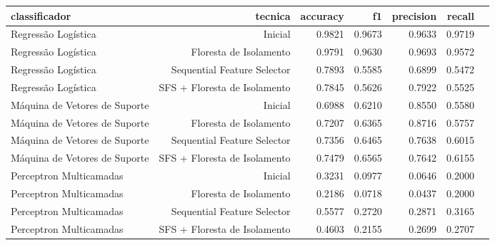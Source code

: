 \begin{tabular}{|l|r|r|r|r|r|r|}
\hline
                 classificador &                       tecnica &  accuracy &      f1 &  precision &  recall \\
\hline
           Regressão Logística &                       Inicial &    0.9821 &  0.9673 &     0.9633 &  0.9719 \\
           Regressão Logística &        Floresta de Isolamento &    0.9791 &  0.9630 &     0.9693 &  0.9572 \\
           Regressão Logística &   Sequential Feature Selector &    0.7893 &  0.5585 &     0.6899 &  0.5472 \\
           Regressão Logística &  SFS + Floresta de Isolamento &    0.7845 &  0.5626 &     0.7922 &  0.5525 \\
 Máquina de Vetores de Suporte &                       Inicial &    0.6988 &  0.6210 &     0.8550 &  0.5580 \\
 Máquina de Vetores de Suporte &        Floresta de Isolamento &    0.7207 &  0.6365 &     0.8716 &  0.5757 \\
 Máquina de Vetores de Suporte &   Sequential Feature Selector &    0.7356 &  0.6465 &     0.7638 &  0.6015 \\
 Máquina de Vetores de Suporte &  SFS + Floresta de Isolamento &    0.7479 &  0.6565 &     0.7642 &  0.6155 \\
       Perceptron Multicamadas &                       Inicial &    0.3231 &  0.0977 &     0.0646 &  0.2000 \\
       Perceptron Multicamadas &        Floresta de Isolamento &    0.2186 &  0.0718 &     0.0437 &  0.2000 \\
       Perceptron Multicamadas &   Sequential Feature Selector &    0.5577 &  0.2720 &     0.2871 &  0.3165 \\
       Perceptron Multicamadas &  SFS + Floresta de Isolamento &    0.4603 &  0.2155 &     0.2699 &  0.2707 \\
\hline
\end{tabular}
